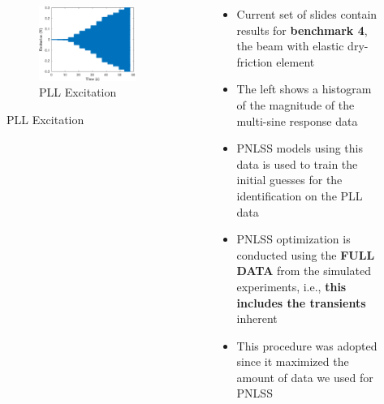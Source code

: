 \documentclass[aspectratio=169]{beamer}
\begin{document}
\begin{frame}
\begin{columns}
\begin{column}{0.3\linewidth}
\begin{figure}[!h]
      \begin{subfigure}{\linewidth}
        \centering
        \includegraphics[width=0.7\linewidth]{../../benchmark4/FIGURES/PLL_EXCITATION}
        \caption{PLL Excitation}
        \label{fig:pllu}
      \end{subfigure}
    \end{figure}
    \end{column}
    \begin{column}{0.7\linewidth}
      \vspace{-1cm}
      \begin{itemize}
      \item Current set of slides contain results for
        \textbf{benchmark 4}, the beam with elastic dry-friction
        element
      \item The left shows a histogram of the magnitude of the
        multi-sine response data
      \item PNLSS models using this data is used to train the initial
        guesses for the identification on the PLL data
      \item PNLSS optimization is conducted using the \textbf{FULL
          DATA} from the simulated experiments, i.e., \textbf{this
          includes the transients} inherent
      \item This procedure was adopted since it maximized the amount
        of data we used for PNLSS
      \end{itemize}
    \end{column}
  \end{columns}
\end{frame}
\end{document}
